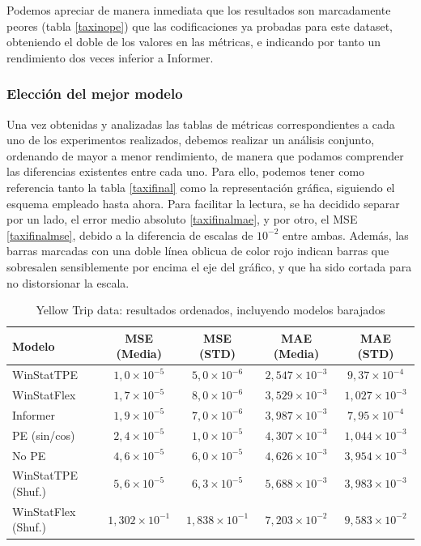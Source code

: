 Podemos apreciar de manera inmediata que los resultados son marcadamente peores (tabla \ref{taxinope}) que las codificaciones ya probadas para este dataset, obteniendo el doble de los valores en las métricas, e indicando por tanto un rendimiento dos veces inferior a Informer.

\subsubsection{Elección del mejor modelo}

Una vez obtenidas y analizadas las tablas de métricas correspondientes a cada uno de los experimentos realizados, debemos realizar un análisis conjunto, ordenando de mayor a menor rendimiento, de manera que podamos comprender las diferencias existentes entre cada uno. Para ello, podemos tener como referencia tanto la tabla \ref{taxifinal} como la representación gráfica, siguiendo el esquema empleado hasta ahora. Para facilitar la lectura, se ha decidido separar por un lado, el error medio absoluto \ref{taxifinalmae}, y por otro, el MSE \ref{taxifinalmse}, debido a la diferencia de escalas de $10^{-2}$ entre ambas. Además, las barras marcadas con una doble línea oblicua de color rojo indican barras que sobresalen sensiblemente por encima el eje del gráfico, y que ha sido cortada para no distorsionar la escala.\\


\begin{table}[!ht]
	\centering
	\begin{tabular}{l|c|c|c|c}
		\toprule
		Modelo & MSE (Media) & MSE (STD) & MAE (Media) & MAE (STD) \\
		\midrule
		WinStatTPE & $1,0 \times 10^{-5}$ & $5,0 \times 10^{-6}$ & $2,547 \times 10^{-3}$ & $9,37 \times 10^{-4}$ \\
		WinStatFlex & $1,7 \times 10^{-5}$ & $8,0 \times 10^{-6}$ & $3,529 \times 10^{-3}$ & $1,027 \times 10^{-3}$ \\
		Informer & $1,9 \times 10^{-5}$ & $7,0 \times 10^{-6}$ & $3,987 \times 10^{-3}$ & $7,95 \times 10^{-4}$ \\
		PE (sin/cos) & $2,4 \times 10^{-5}$ & $1,0 \times 10^{-5}$ & $4,307 \times 10^{-3}$ & $1,044 \times 10^{-3}$ \\
		No PE & $4,6 \times 10^{-5}$ & $6,0 \times 10^{-5}$ & $4,626 \times 10^{-3}$ & $3,954 \times 10^{-3}$ \\
		WinStatTPE (Shuf.) & $5,6 \times 10^{-5}$ & $6,3 \times 10^{-5}$ & $5,688 \times 10^{-3}$ & $3,983 \times 10^{-3}$ \\
		WinStatFlex (Shuf.) & $1,302 \times 10^{-1}$ & $1,838 \times 10^{-1}$ & $7,203 \times 10^{-2}$ & $9,583 \times 10^{-2}$ \\
		\bottomrule
	\end{tabular}
	\caption{Yellow Trip data: resultados ordenados, incluyendo modelos barajados}
	\label{tab:resumen_modelos}
\end{table}


